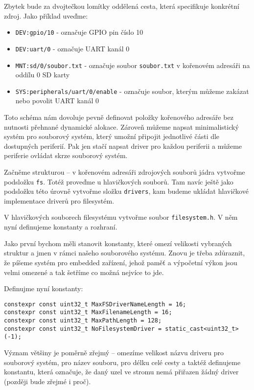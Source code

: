 \documentclass{article}
\begin{document}
Zbytek bude za dvojtečkou lomítky oddělená cesta, která specifikuje konkrétní zdroj. Jako příklad uveďme:
\begin{itemize}
	\item \texttt{DEV:gpio/10} - označuje GPIO pin číslo 10
	\item \texttt{DEV:uart/0} - označuje UART kanál 0
	\item \texttt{MNT:sd/0/soubor.txt} - označuje soubor \texttt{soubor.txt} v kořenovém adresáři na oddílu 0 SD karty
	\item \texttt{SYS:peripherals/uart/0/enable} - označuje soubor, kterým můžeme zakázat nebo povolit UART kanál 0
\end{itemize}

Toto schéma nám dovoluje pevně definovat položky kořenového adresáře bez nutnosti přehnané dynamické alokace. Zároveň můžeme napsat minimalistický systém  pro souborový systém, který umožní připojit jednotlivé části dle dostupných periferií. Pak jen stačí napsat driver pro každou periferii a můžeme periferie ovládat skrze souborový systém.

Začněme strukturou -- v kořenovém adresáři zdrojových souborů jádra vytvořme podsložku \texttt{fs}. Totéž proveďme u hlavičkových souborů. Tam navíc ještě jako podsložku této úrovně vytvořme složku \texttt{drivers}, kam budeme ukládat hlavičkové implementace driverů pro filesystém.

V hlavičkových souborech filesystému vytvořme soubor \texttt{filesystem.h}. V něm nyní definujeme konstanty a rozhraní.

Jako první bychom měli stanovit konstanty, které omezí velikosti vybraných struktur a jmen v rámci našeho souborového systému. Znovu je třeba zdůraznit, že píšeme systém pro embedded zařízení, jehož paměť a výpočetní výkon jsou velmi omezené a tak šetříme co možná nejvíce to jde.

Definujme nyní konstanty:
\begin{lstlisting}
constexpr const uint32_t MaxFSDriverNameLength = 16;
constexpr const uint32_t MaxFilenameLength = 16;
constexpr const uint32_t MaxPathLength = 128;
constexpr const uint32_t NoFilesystemDriver = static_cast<uint32_t>(-1);
\end{lstlisting}
Význam většiny je poměrně zřejmý -- omezíme velikost názvu driveru pro souborový systém, pro název souboru, pro délku celé cesty a taktéž definujeme konstantu, která označuje, že daný uzel ve stromu nemá přiřazen žádný driver (později bude zřejmé i proč).
\end{document}
